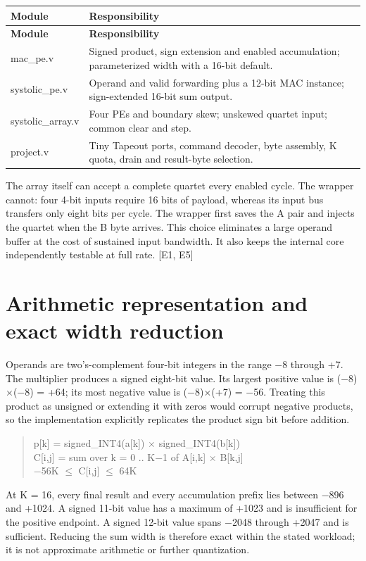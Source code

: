 \documentclass[10pt,letterpaper]{article}
\begin{document}
{\small\begin{longtable}{>{\raggedright\arraybackslash}p{0.250000\dimexpr\linewidth-4\tabcolsep\relax}>{\raggedright\arraybackslash}p{0.750000\dimexpr\linewidth-4\tabcolsep\relax}}\toprule
\textbf{Module} & \textbf{Responsibility}\\\midrule\endfirsthead\textbf{Module} & \textbf{Responsibility}\\\midrule\endhead
mac\_pe.v & Signed product, sign extension and enabled accumulation; parameterized width with a 16-bit default.\\
systolic\_pe.v & Operand and valid forwarding plus a 12-bit MAC instance; sign-extended 16-bit sum output.\\
systolic\_array.v & Four PEs and boundary skew; unskewed quartet input; common clear and step.\\
project.v & Tiny Tapeout ports, command decoder, byte assembly, K quota, drain and result-byte selection.\\
\bottomrule\end{longtable}}
The array itself can accept a complete quartet every enabled cycle. The wrapper cannot: four 4-bit inputs require 16 bits of payload, whereas its input bus transfers only eight bits per cycle. The wrapper first saves the A pair and injects the quartet when the B byte arrives. This choice eliminates a large operand buffer at the cost of sustained input bandwidth. It also keeps the internal core independently testable at full rate. [E1, E5]

\clearpage
\section{Arithmetic representation and exact width reduction}
Operands are two's-complement four-bit integers in the range \ensuremath{-}8 through +7. The multiplier produces a signed eight-bit value. Its largest positive value is (\ensuremath{-}8)\ensuremath{\times}(\ensuremath{-}8) = +64; its most negative value is (\ensuremath{-}8)\ensuremath{\times}(+7) = \ensuremath{-}56. Treating this product as unsigned or extending it with zeros would corrupt negative products, so the implementation explicitly replicates the product sign bit before addition.

\begin{quote}\ttfamily\small p[k] = signed\_INT4(a[k]) \ensuremath{\times} signed\_INT4(b[k])\\
C[i,j] = sum over k = 0 .. K\ensuremath{-}1 of A[i,k] \ensuremath{\times} B[k,j]\\
\ensuremath{-}56K \ensuremath{\leq} C[i,j] \ensuremath{\leq} 64K\end{quote}
At K = 16, every final result and every accumulation prefix lies between \ensuremath{-}896 and +1024. A signed 11-bit value has a maximum of +1023 and is insufficient for the positive endpoint. A signed 12-bit value spans \ensuremath{-}2048 through +2047 and is sufficient. Reducing the sum width is therefore exact within the stated workload; it is not approximate arithmetic or further quantization.
\end{document}
